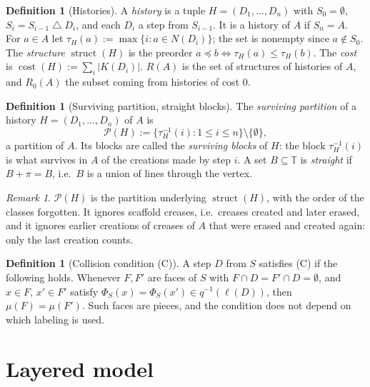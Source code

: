\documentclass[11pt]{amsart}
\theoremstyle{definition}
\newtheorem{definition}[theorem]{Definition}
\theoremstyle{remark}
\newtheorem{remark}[theorem]{Remark}
\newcommand{\T}{\mathbb{T}}
\newcommand{\struct}{\operatorname{struct}}
\newcommand{\cost}{\operatorname{cost}}
\newcommand{\Surv}{\mathcal{P}}
\begin{document}
\begin{definition}[Histories]\label{def:hist}
A \emph{history} is a tuple $H=(D_1,\dots,D_n)$ with $S_0=\emptyset$,
$S_i=S_{i-1}\mathbin{\triangle}D_i$, and each $D_i$ a step from $S_{i-1}$. It is a history of $A$
if $S_n=A$. For $a\in A$ let $\tau_H(a):=\max\{i : a\in N(D_i)\}$; the set is nonempty since $a\notin S_0$. The \emph{structure}
$\struct(H)$ is the preorder $a\preceq b\iff\tau_H(a)\le\tau_H(b)$. The \emph{cost} is
$\cost(H):=\sum_i|K(D_i)|$. $R(A)$ is the set of structures of histories of $A$, and $R_0(A)$
the subset coming from histories of cost $0$.
\end{definition}

\begin{definition}[Surviving partition, straight blocks]\label{def:surv}
The \emph{surviving partition} of a history $H=(D_1,\dots,D_n)$ of $A$ is
\[
\Surv(H):=\bigl\{\tau_H^{-1}(i) : 1\le i\le n\bigr\}\setminus\{\emptyset\},
\]
a partition of $A$. Its blocks are called the \emph{surviving blocks} of $H$: the block
$\tau_H^{-1}(i)$ is what survives in $A$ of the creations made by step $i$. A set $B\subseteq\T$ is
\emph{straight} if $B+\pi=B$, i.e.\ $B$ is a union of lines through the vertex.
\end{definition}

\begin{remark}\label{rem:surv}
$\Surv(H)$ is the partition underlying $\struct(H)$, with the order of the classes forgotten.
It ignores scaffold creases, i.e.\ creases created and later erased, and it ignores earlier
creations of creases of $A$ that were erased and created again: only the last creation counts.
\end{remark}

\begin{definition}[Collision condition (C)]\label{def:C}
A step $D$ from $S$ satisfies (C) if the following holds. Whenever $F,F'$ are faces of $S$ with
$F\cap D=F'\cap D=\emptyset$, and $x\in F$, $x'\in F'$ satisfy
$\Phi_S(x)=\Phi_S(x')\in q^{-1}(\ell(D))$, then $\mu(F)=\mu(F')$. Such faces are pieces, and the
condition does not depend on which labeling is used.
\end{definition}

\section{Layered model}
\end{document}
